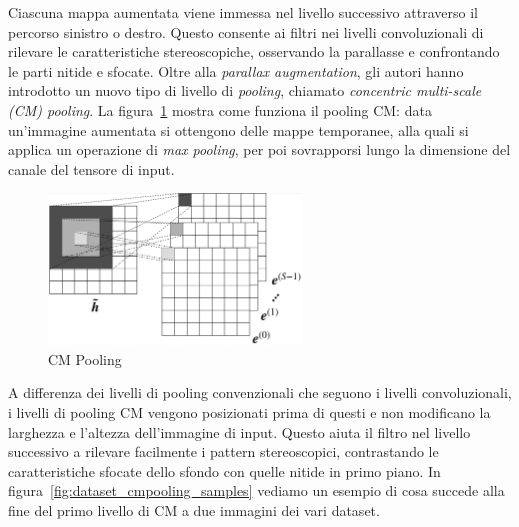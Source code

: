 \documentclass[italian,12pt,a4paper,oneside,final]{report}
\begin{document}
\noindent Ciascuna mappa aumentata viene immessa nel livello successivo attraverso il percorso sinistro o destro.
Questo consente ai filtri nei livelli convoluzionali di rilevare le caratteristiche stereoscopiche, osservando la parallasse e confrontando le parti nitide e sfocate.
Oltre alla \textit{parallax augmentation}, gli autori hanno introdotto un nuovo tipo di livello di \textit{pooling}, chiamato \textit{concentric multi-scale (CM) pooling}.
La figura~\ref{fig:cnn2_cmpooling} mostra come funziona il pooling CM: data un'immagine aumentata si ottengono delle mappe temporanee, alla quali si applica un operazione di \textit{max pooling}, per poi sovrapporsi lungo la dimensione del canale del tensore di input.
\begin{figure}[ht]
	\centering
	\includegraphics[width=0.6\textwidth]{cmpooling.png}
	\caption{CM Pooling}
	\label{fig:cnn2_cmpooling}
\end{figure}

\noindent A differenza dei livelli di pooling convenzionali che seguono i livelli convoluzionali, i livelli di pooling CM vengono posizionati prima di questi e non modificano la larghezza e l'altezza dell'immagine di input.
Questo aiuta il filtro nel livello successivo a rilevare facilmente i pattern stereoscopici, contrastando le caratteristiche sfocate dello sfondo con quelle nitide in primo piano.
In figura~\ref{fig:dataset_cmpooling_samples} vediamo un esempio di cosa succede alla fine del primo livello di CM a due immagini dei vari dataset.
\end{document}
